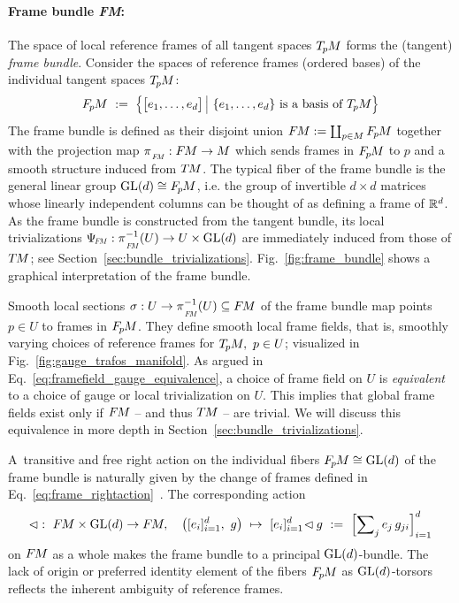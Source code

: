 \paragraph{Frame bundle \textit{FM}:}
The space of local reference frames of all tangent spaces $T_{\mkern-1.5mu p}\mkern-.5muM$ forms the (tangent) \emph{frame bundle}.
Consider the spaces of reference frames (ordered bases) of the individual tangent spaces $T_{\mkern-1.5mu p}\mkern-.5muM$:
\begin{align}
    \FpM\ :=\ \pig\{ \big[e_{1},\dots,e_{d}\big]\, \pig|\ \{e_{1},\dots,e_{d}\}\ \text{is a basis of } \TpM \pig\}
\end{align}
The frame bundle is defined as their disjoint union $F\mkern-1.5muM := \coprod_{p\in M} F_{\mkern-1.5mu p}\mkern-1.0muM$ together with the projection map $\piFM: \FM\to M$ which sends frames in $F_{\mkern-1.5mu p}\mkern-1.0muM$ to $p$ and a smooth structure induced from $T\mkern-1.5muM$.
The typical fiber of the frame bundle is
the general linear group $\operatorname{GL}(d)\cong F_{\mkern-1.5mu p}\mkern-1.0muM$, i.e. the group of invertible $d\!\times\!d$ matrices whose linearly independent columns can be thought of as defining a frame of $\mathbb{R}^d$.
As the frame bundle is constructed from the tangent bundle, its local trivializations $\PsiFM: \piFM^{-1}(U) \to U \times \GL{d}$ are immediately induced from those of $T\mkern-1.5muM$; see Section~\ref{sec:bundle_trivializations}.
Fig.~\ref{fig:frame_bundle} shows a graphical interpretation of the frame bundle.


Smooth local sections $\sigma:U\to\piFM^{-1}(U)\subseteq \FM$ of the frame bundle map points $p\in U$ to frames in $F_{\mkern-1.5mu p}\mkern-1.0muM$.
They define smooth local frame fields, that is, smoothly varying choices of reference frames for $T_{\mkern-1.5mu p}\mkern-.5muM,\ p\in U$; visualized in Fig.~\ref{fig:gauge_trafos_manifold}.
As argued in Eq.~\eqref{eq:framefield_gauge_equivalence}, a choice of frame field on $U$ is \emph{equivalent} to a choice of gauge or local trivialization on $U$.
This implies that global frame fields exist only if $F\mkern-1.5muM$ -- and thus $T\mkern-1.5muM$ -- are trivial.
We will discuss this equivalence in more depth in Section~\ref{sec:bundle_trivializations}.

A~transitive and free right action on the individual fibers $F_{\mkern-1.5mu p}\mkern-1.0muM\cong\operatorname{GL}(d)$ of the frame bundle is naturally given by the change of frames defined in Eq.~\eqref{eq:frame_rightaction}~\cite{schullerGeometricalAnatomy2016}.
The corresponding action
\begin{align}\label{eq:rightaction_FM}
    \lhd:\ \FM\times \GL{d} \to \FM, \quad
    \big( [e_i]_{i=1}^d,\ g \big)
    \ \mapsto\ 
    [e_i]_{i=1}^d\! \lhd g \ :=\ 
    \left[ \sum\nolimits_j e_j\, g_{ji} \right]_{i=1}^d
\end{align}
on $F\mkern-1.5muM$ as a whole makes the frame bundle to a principal $\operatorname{GL}(d)$-bundle.
The lack of origin or preferred identity element of the fibers $F_{\mkern-1.5mu p}\mkern-1.0muM$ as $\operatorname{GL}(d)$-torsors reflects the inherent ambiguity of reference frames.










